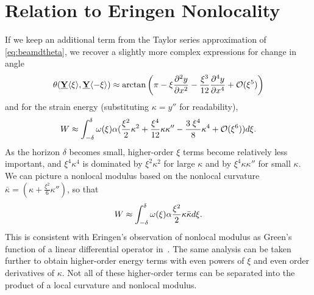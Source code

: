 \documentclass[11pt]{amsart}
\newcommand\vstate[3]{%
	\mathbf{\underline{#1}}%
	\ifstrempty{#2}{}{[#2]}%
	\ifstrempty{#3}{}{\langle #3 \rangle}}
\begin{document}
\section{Relation to Eringen Nonlocality}
If we keep an additional term from the Taylor series approximation of \cref{eq:beamdtheta}, we recover a slightly more complex expressions for change in angle
%
\begin{equation}
\label{eq:beamdthetaHOT}
\theta(\vstate{Y}{}{\xi},\vstate{Y}{}{\mathbf{-\xi}}) \approx \arctan\left(\pi-\xi \frac{\partial^2 y}{\partial x^2} -\frac{\xi^3}{12} \frac{\partial^4 y}{\partial x^4}  +\mathcal{O}(\xi^5)\right)\notag
\end{equation}
%
and for the strain energy (substituting \(\kappa = y''\) for readability),
%
%
%
\begin{equation}
W \approx \int_{-\delta}^\delta \omega(\xi)\alpha(\frac{\xi^2}{2}\kappa^2+\frac{\xi^4}{12}\kappa\kappa''-\frac{3\; \xi^4}{8}\kappa^4+\mathcal{O}(\xi^6)) d\xi .\notag
\end{equation}
%
As the horizon \(\delta\) becomes small, higher-order \(\xi\) terms become relatively less important, and \(\xi^4\kappa^4\) is dominated by \(\xi^2\kappa^2\) for large \(\kappa\) and by \(\xi^4\kappa\kappa''\) for small \(\kappa\).
We can picture a nonlocal modulus based on the nonlocal curvature \(\bar{\kappa}= (\kappa + \frac{\xi^2}{6}\kappa'')\), so that 
%
\begin{equation}
W \approx \int_{-\delta}^\delta \omega(\xi)\alpha \frac{\xi^2}{2}\kappa\bar{\kappa}d\xi .\notag
\end{equation}
%  
This is consistent with Eringen's observation of nonlocal modulus as Green's function of a linear differential operator in~\cite{eringen1983differential}. 
The same analysis can be taken further to obtain higher-order energy terms with even powers of \(\xi\) and even order derivatives of \(\kappa\). 
Not all of these higher-order terms can be separated into the product of a local curvature and nonlocal modulus.
\end{document}
